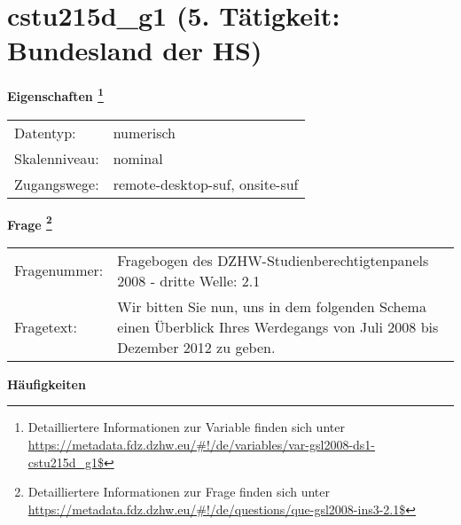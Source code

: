 
    \setcounter{footnote}{0}

    \vspace*{-1.8cm}
	\section{cstu215d\_g1 (5. Tätigkeit: Bundesland der HS)}
	\label{section:cstu215d_g1}



    \vspace*{0.5cm}
    \noindent\textbf{Eigenschaften
	\footnote{Detailliertere Informationen zur Variable finden sich unter
		\url{https://metadata.fdz.dzhw.eu/\#!/de/variables/var-gsl2008-ds1-cstu215d_g1$}}}\\
	\begin{tabularx}{\hsize}{@{}lX}
	Datentyp: & numerisch \\
	Skalenniveau: & nominal \\
	Zugangswege: &
	  remote-desktop-suf, 
	  onsite-suf
 \\
    \end{tabularx}



				\vspace*{0.5cm}
                \noindent\textbf{Frage
	                \footnote{Detailliertere Informationen zur Frage finden sich unter
		              \url{https://metadata.fdz.dzhw.eu/\#!/de/questions/que-gsl2008-ins3-2.1$}}}\\
				\begin{tabularx}{\hsize}{@{}lX}
					Fragenummer: &
					  Fragebogen des DZHW-Studienberechtigtenpanels 2008 - dritte Welle:
					  2.1
 \\
					Fragetext: & Wir bitten Sie nun, uns in dem folgenden Schema einen Überblick Ihres Werdegangs von Juli 2008 bis Dezember 2012 zu geben. \\
				\end{tabularx}





        		\vspace*{0.5cm}
                \noindent\textbf{Häufigkeiten}

